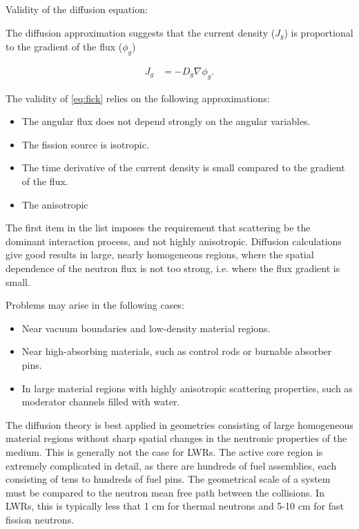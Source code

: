 \documentclass[11pt,letterpaper]{article}
\begin{document}
Validity of the diffusion equation:

The diffusion approximation suggests that the current density ($J_g$) is proportional to the gradient of the flux ($\phi_g$)

\begin{align}
J_g &= -D_g \nabla \phi_g.
\label{eq:fick}
\end{align}

The validity of \ref{eq:fick} relies on the following approximations:


\begin{itemize}
	\item The angular flux does not depend strongly on the angular variables.
	\item The fission source is isotropic.
	\item The time derivative of the current density is small compared to the gradient of the flux.
	\item The anisotropic
\end{itemize}

The first item in the list imposes the requirement that scattering be the dominant interaction process, and not highly anisotropic.
Diffusion calculations give good results in large, nearly homogeneous regions, where the spatial dependence
of the neutron flux is not too strong, i.e. where the flux gradient is small.

Problems may arise in the following cases:
\begin{itemize}
	\item Near vacuum boundaries and low-density material regions.
	\item Near high-absorbing materials, such as control rods or burnable absorber pins.
	\item In large material regions with highly anisotropic scattering properties, such as moderator channels filled with water.
\end{itemize}

The diffusion theory is best applied in geometries consisting of large homogeneous material regions without sharp spatial changes in the neutronic properties of the medium.
This is generally not the case for \glspl{LWR}.
The active core region is extremely complicated in detail, as there are hundreds of fuel assemblies, each consisting of tens to hundreds of fuel pins.
The geometrical scale of a system must be compared to the neutron mean free path between the
collisions.
In \glspl{LWR}, this is typically less that 1 cm for thermal neutrons and 5-10 cm for fast fission neutrons.
\end{document}
